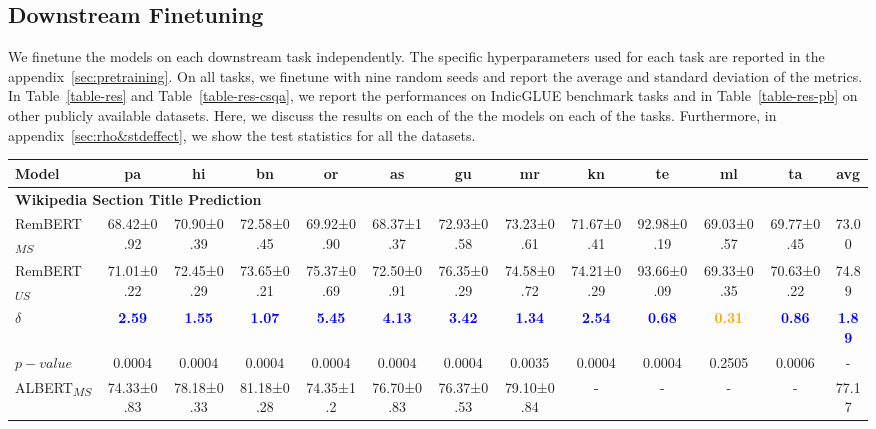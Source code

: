 \documentclass[11pt]{article}
\begin{document}
\subsection{Downstream Finetuning}
\label{downstream-finetuning}
We finetune the models on each downstream task independently.
The specific hyperparameters used for each task are reported in the appendix~\ref{sec:pretraining}. On all tasks, we finetune with nine random seeds and report the average and standard deviation of the metrics. In Table~\ref{table-res} and Table~\ref{table-res-csqa}, we report the performances on IndicGLUE benchmark tasks and in Table~\ref{table-res-pb} on other publicly available datasets. Here, we discuss the results on each of the the models on each of the tasks. Furthermore, in appendix~\ref{sec:rho&stdeffect}, we show the test statistics for all the datasets. 
\begin{table*}[hbt!]
\begin{adjustbox}{max width=\textwidth}
\begin{tabular}{l c c c c c c c c c c c c}
\toprule[2pt]
\textbf{Model} & \textbf{pa} & \textbf{hi} & \textbf{bn} & \textbf{or} & \textbf{as} & \textbf{gu} & \textbf{mr} & \textbf{kn} & \textbf{te} & \textbf{ml} & \textbf{ta} & \textbf{avg} \\
\midrule[2pt]
\multicolumn{13}{l}{\textbf{Wikipedia Section Title Prediction}}\\
RemBERT\textsubscript{$MS$}   & 68.42±0.92 & 70.90±0.39 & 72.58±0.45 & 69.92±0.90 & 68.37±1.37 & 72.93±0.58 & 73.23±0.61 & 71.67±0.41 & 92.98±0.19 & 69.03±0.57 & 69.77±0.45 & 73.00\\
RemBERT\textsubscript{$US$}   & 71.01±0.22 & 72.45±0.29 & 73.65±0.21 & 75.37±0.69 & 72.50±0.91 & 76.35±0.29 & 74.58±0.72 & 74.21±0.29 & 93.66±0.09 & 69.33±0.35 & 70.63±0.22 & 74.89\\
$\delta$ & \textcolor{blue}{\textbf{2.59}} & \textcolor{blue}{\textbf{1.55}} & \textcolor{blue}{\textbf{1.07}} & \textcolor{blue}{\textbf{5.45}} & \textcolor{blue}{\textbf{4.13}} & \textcolor{blue}{\textbf{3.42}} & \textcolor{blue}{\textbf{1.34}} & \textcolor{blue}{\textbf{2.54}} & \textcolor{blue}{\textbf{0.68}} & \textcolor{orange}{\textbf{0.31}} & \textcolor{blue}{\textbf{0.86}} & \textcolor{blue}{\textbf{1.89}}\\
$p-value$ &0.0004	&0.0004	&0.0004	&0.0004	&0.0004	&0.0004	&0.0035 &0.0004 & 0.0004 & 0.2505 & 0.0006 & -\\
\midrule[1pt]
ALBERT\textsubscript{$MS$}           & 74.33±0.83 & 78.18±0.33 & 81.18±0.28 & 74.35±1.2 & 76.70±0.83 & 76.37±0.53 & 79.10±0.84 & - &- & - & - & 77.17 \\

\end{tabular}
\end{adjustbox}
\end{table*}
\end{document}
